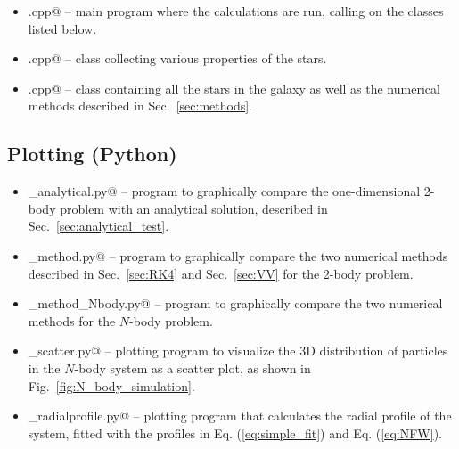 \documentclass{article}
\begin{document}
\begin{multicols}{2}
\begin{itemize}
	\item \verb@main.cpp@ -- main program where the calculations are run, calling on the classes listed below. 
	\item \verb@star.cpp@ -- class collecting various properties of the stars.
	\item \verb@galaxy.cpp@ -- class containing all the stars in the galaxy as well as the numerical methods described in Sec.~\ref{sec:methods}.
\end{itemize}


\subsection{Plotting (Python)}

\begin{itemize}
	\item \verb@plotting_analytical.py@ -- program to graphically compare the one-dimensional 2-body problem with an analytical solution, described in Sec.~\ref{sec:analytical_test}.
	\item \verb@plot_method.py@ -- program to graphically compare the two numerical methods described in Sec.~\ref{sec:RK4} and Sec.~\ref{sec:VV} for the 2-body problem.
	\item \verb@plot_method_Nbody.py@ -- program to graphically compare the two numerical methods for the $N$-body problem.
	\item \verb@plotting_scatter.py@ -- plotting program to visualize the 3D distribution of particles in the $N$-body system as a scatter plot, as shown in Fig.~\ref{fig:N_body_simulation}. 
	\item \verb@plotting_radialprofile.py@ -- plotting program that calculates the radial profile of the system, fitted with the profiles in Eq. (\ref{eq:simple_fit}) and Eq. (\ref{eq:NFW}).
\end{itemize}




\end{multicols}
\end{document}

